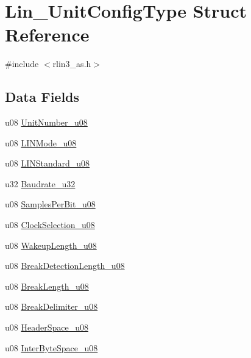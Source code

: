 \hypertarget{struct_lin___unit_config_type}{}\section{Lin\+\_\+\+Unit\+Config\+Type Struct Reference}
\label{struct_lin___unit_config_type}


{\ttfamily \#include $<$rlin3\+\_\+as.\+h$>$}

\subsection*{Data Fields}
\begin{DoxyCompactItemize}
\item 
u08 \mbox{\hyperlink{struct_lin___unit_config_type_a26489b36f670efde2c46904a35e08ed0}{Unit\+Number\+\_\+u08}}
\item 
u08 \mbox{\hyperlink{struct_lin___unit_config_type_a47328c65cad3d49ae171388469ed15d2}{L\+I\+N\+Mode\+\_\+u08}}
\item 
u08 \mbox{\hyperlink{struct_lin___unit_config_type_a3360c6d700297ea9bce9372c50a4aee0}{L\+I\+N\+Standard\+\_\+u08}}
\item 
u32 \mbox{\hyperlink{struct_lin___unit_config_type_a1952780932727a7349ef6e6b489f7a28}{Baudrate\+\_\+u32}}
\item 
u08 \mbox{\hyperlink{struct_lin___unit_config_type_a891dded7c9e30ba41a954c8e9f290955}{Samples\+Per\+Bit\+\_\+u08}}
\item 
u08 \mbox{\hyperlink{struct_lin___unit_config_type_a6a2cce1409d9b664e0e455d6196c3261}{Clock\+Selection\+\_\+u08}}
\item 
u08 \mbox{\hyperlink{struct_lin___unit_config_type_acaa03f8e436266e450f3f1abdf33dd7a}{Wakeup\+Length\+\_\+u08}}
\item 
u08 \mbox{\hyperlink{struct_lin___unit_config_type_a92709d1c5b449eed4f6683cda4ad01aa}{Break\+Detection\+Length\+\_\+u08}}
\item 
u08 \mbox{\hyperlink{struct_lin___unit_config_type_ab59721a04c49c3d2f9984e571e120aee}{Break\+Length\+\_\+u08}}
\item 
u08 \mbox{\hyperlink{struct_lin___unit_config_type_a78aef72c54e48e90425db16c6a3f76dc}{Break\+Delimiter\+\_\+u08}}
\item 
u08 \mbox{\hyperlink{struct_lin___unit_config_type_a14183990567149850bcf8684292e50d4}{Header\+Space\+\_\+u08}}
\item 
u08 \mbox{\hyperlink{struct_lin___unit_config_type_a3c3a29cbc35992b22e460a8c5c11a3d4}{Inter\+Byte\+Space\+\_\+u08}}

\end{DoxyCompactItemize}
